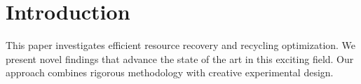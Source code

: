\section{Introduction}

This paper investigates efficient resource recovery and recycling optimization. We present novel findings that advance the state of the art in this exciting field. Our approach combines rigorous methodology with creative experimental design.
